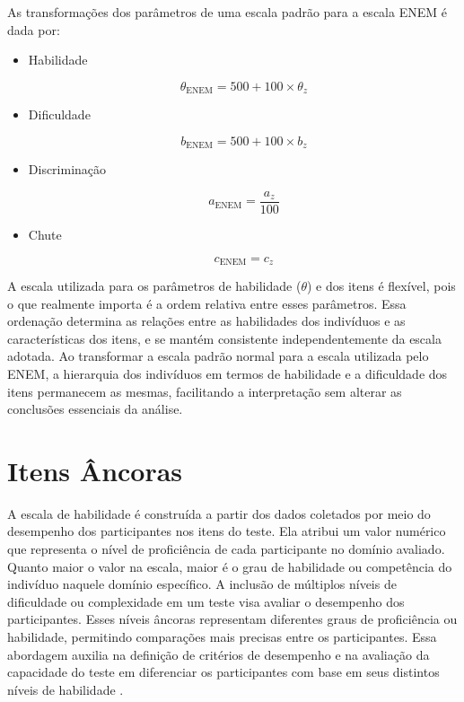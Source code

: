 As transformações dos parâmetros de uma escala padrão para a escala ENEM é dada por:
\begin{itemize}
	
\item Habilidade

\[
	\theta_{\text{ENEM}} = 500 + 100 \times \theta_z
\]




\item Dificuldade

 
 \[
 b_{\text{ENEM}} = 500 + 100 \times b_z 
 \]
 
 \item Discriminação
 
 \[
 	a_{\text{ENEM}} = \frac{a_z}{100}
 \]
 
 \item Chute
 
 \[
 c_{\text{ENEM}} = c_z
 \]
\end{itemize}


A escala utilizada para os parâmetros de habilidade ($\theta$) e dos itens é flexível, pois o que realmente importa é a ordem relativa entre esses parâmetros. Essa ordenação determina as relações entre as habilidades dos indivíduos e as características dos itens, e se mantém consistente independentemente da escala adotada. Ao transformar a escala padrão normal  para a escala utilizada pelo ENEM, a hierarquia dos indivíduos em termos de habilidade e a dificuldade dos itens permanecem as mesmas, facilitando a interpretação sem alterar as conclusões essenciais da análise.

\section{Itens Âncoras}

A escala de habilidade é construída a partir dos dados coletados por meio do desempenho dos participantes nos itens do teste. Ela atribui um valor numérico que representa o nível de proficiência de cada participante no domínio avaliado. Quanto maior o valor na escala, maior é o grau de habilidade ou competência do indivíduo naquele domínio específico. A inclusão de múltiplos níveis de dificuldade ou complexidade em um teste visa avaliar o desempenho dos participantes. Esses níveis âncoras representam diferentes graus de proficiência ou habilidade, permitindo comparações mais precisas entre os participantes. Essa abordagem auxilia na definição de critérios de desempenho e na avaliação da capacidade do teste em diferenciar os participantes com base em seus distintos níveis de habilidade \cite{valle2001}.

